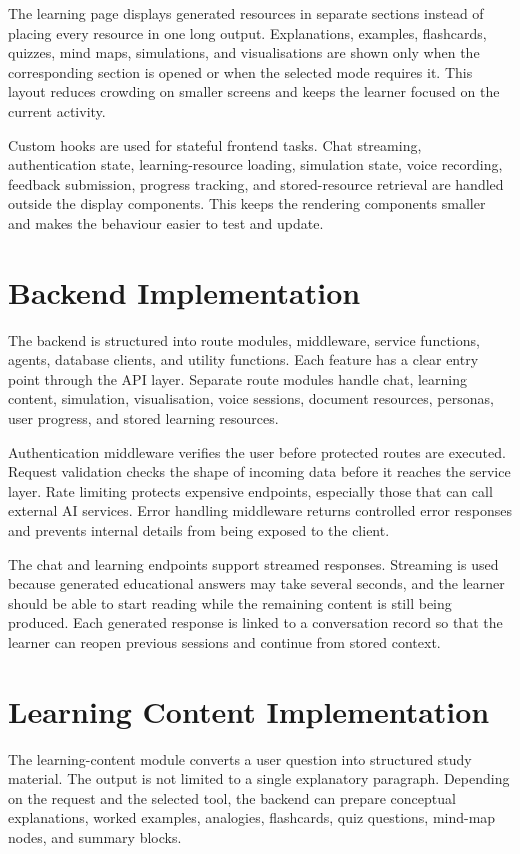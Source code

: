 The learning page displays generated resources in separate sections instead of placing every resource in one long output. Explanations, examples, flashcards, quizzes, mind maps, simulations, and visualisations are shown only when the corresponding section is opened or when the selected mode requires it. This layout reduces crowding on smaller screens and keeps the learner focused on the current activity.

Custom hooks are used for stateful frontend tasks. Chat streaming, authentication state, learning-resource loading, simulation state, voice recording, feedback submission, progress tracking, and stored-resource retrieval are handled outside the display components. This keeps the rendering components smaller and makes the behaviour easier to test and update.

\section[Backend Implementation]{\textbf{Backend Implementation}}
The backend is structured into route modules, middleware, service functions, agents, database clients, and utility functions. Each feature has a clear entry point through the API layer. Separate route modules handle chat, learning content, simulation, visualisation, voice sessions, document resources, personas, user progress, and stored learning resources.

Authentication middleware verifies the user before protected routes are executed. Request validation checks the shape of incoming data before it reaches the service layer. Rate limiting protects expensive endpoints, especially those that can call external AI services. Error handling middleware returns controlled error responses and prevents internal details from being exposed to the client.

The chat and learning endpoints support streamed responses. Streaming is used because generated educational answers may take several seconds, and the learner should be able to start reading while the remaining content is still being produced. Each generated response is linked to a conversation record so that the learner can reopen previous sessions and continue from stored context.

\section[Learning Content Implementation]{\textbf{Learning Content Implementation}}
The learning-content module converts a user question into structured study material. The output is not limited to a single explanatory paragraph. Depending on the request and the selected tool, the backend can prepare conceptual explanations, worked examples, analogies, flashcards, quiz questions, mind-map nodes, and summary blocks.

